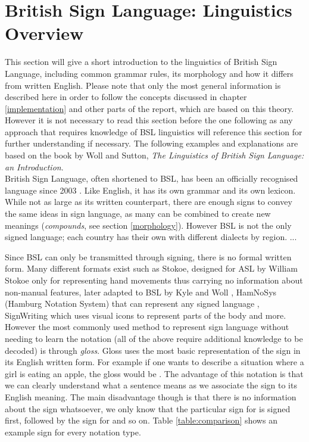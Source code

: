 \documentclass[12pt]{ociamthesis}  %
\begin{document}
\section{British Sign Language: Linguistics Overview}
This section will give a short introduction to the linguistics of British Sign Language, including common grammar rules, its morphology and how it differs from written English. Please note that only the most general information is described here in order to follow the concepts discussed in chapter \ref{implementation} and other parts of the report, which are based on this theory. However it is not necessary to read this section before the one following as any approach that requires knowledge of BSL linguistics will reference this section for further understanding if necessary. The following examples and explanations are based on the book by Woll and Sutton, \textit{The Linguistics of British Sign Language: an Introduction}. \\

British Sign Language, often shortened to BSL, has been an officially recognised language since 2003 . Like English, it has its own grammar  and its own lexicon. While not as large as its written counterpart, there are enough signs to convey the same ideas in sign language, as many can be combined to create new meanings (\textit{compounds}, see section \ref{morphology}). However BSL is not the only signed language; each country has their own with different dialects by region. ...  

Since BSL can only be transmitted through signing, there is no formal written form. Many different formats exist such as Stokoe, designed for ASL by William Stokoe only for representing hand movements  thus carrying no information about non-manual features, later adapted to BSL by Kyle and Woll , HamNoSys (Hamburg Notation System) that can represent any signed language , SignWriting which uses visual icons to represent parts of the body  and more. However the most commonly used method to represent sign language without needing to learn the notation (all of the above require additional knowledge to be decoded) is through \textit{gloss}. Gloss uses the most basic representation of the sign in its English written form. For example if one wants to describe a situation where a girl is eating an apple, the gloss would be . The advantage of this notation is that we can clearly understand what a sentence means as we associate the sign to its English meaning. The main disadvantage though is that there is no information about the sign whatsoever, we only know that the particular sign for  is signed first, followed by the sign for  and so on. Table \ref{table:comparison} shows an example sign for every notation type.
\end{document}
